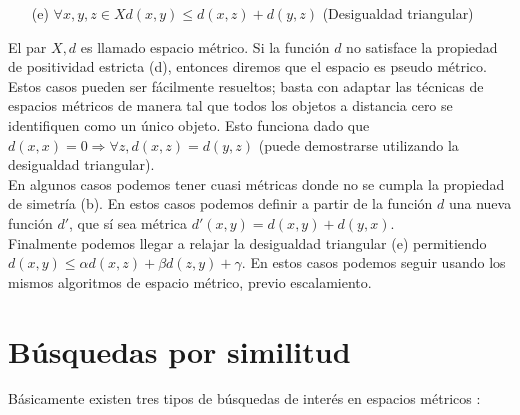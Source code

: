 \begin{enumerate}
\item  [(e)] $\forall x,y,z \in X d(x,y) \leq d(x,z) + d(y,z)$ (Desigualdad triangular)
\end{enumerate}

El par $X,d$ es llamado espacio m\'etrico. Si la funci\'on $d$ no satisface la propiedad de 
positividad estricta (d), entonces diremos que el espacio es pseudo m\'etrico. Estos casos pueden 
ser f\'acilmente resueltos; basta con adaptar las t\'ecnicas de espacios m\'etricos de manera tal 
que todos los objetos a distancia cero se identifiquen como un \'unico objeto. Esto funciona dado 
que $d(x,x) = 0 \Rightarrow \forall z, d(x,z) = d(y,z)$ (puede demostrarse utilizando la 
desigualdad triangular).\\

En algunos casos podemos tener cuasi m\'etricas donde no se cumpla la propiedad de simetr\'ia (b). 
En estos casos podemos definir a partir de la funci\'on $d$ una nueva funci\'on $d'$, que s\'i sea 
m\'etrica $d'(x,y) = d(x,y) + d(y,x)$.\\

Finalmente podemos llegar a relajar la desigualdad triangular (e) permitiendo $d(x,y)  \leq \alpha 
d(x,z) +  \beta d(z,y) + \gamma$. En estos casos podemos seguir usando los mismos algoritmos de 
espacio m\'etrico, previo escalamiento.\\


\section{B\'usquedas por similitud}
B\'asicamente existen tres tipos de b\'usquedas de inter\'es en
espacios m\'etricos \cite{oursurvey}:

